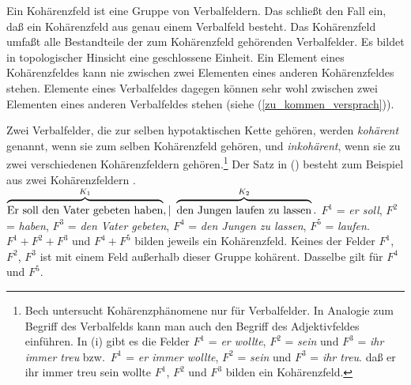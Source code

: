 Ein Kohärenzfeld ist eine Gruppe von Verbalfeldern. Das schließt den Fall ein,
daß ein Kohärenzfeld aus genau einem Verbalfeld besteht. Das Kohärenzfeld umfaßt alle Bestandteile der
zum Kohärenzfeld gehörenden Verbalfelder. Es bildet in topologischer
Hinsicht eine geschlossene Einheit. Ein Element eines Kohärenzfeldes kann nie zwischen
zwei Elementen eines anderen Kohärenzfeldes stehen. Elemente eines Verbalfeldes dagegen
können sehr wohl zwischen zwei Elementen eines anderen Verbalfeldes stehen (siehe (\ref{zu_kommen_versprach})).

Zwei Verbalfelder, die zur selben hypotaktischen Kette gehören, werden \emph{kohärent} genannt,%
wenn sie zum selben Kohärenzfeld gehören, und \emph{inkohärent},%
wenn sie zu zwei verschiedenen Kohärenzfeldern gehören.\footnote{
        Bech untersucht Kohärenzphänomene nur für Verbalfelder.
        In Analogie zum Begriff des Verbalfelds kann man
        auch den Begriff des Adjektivfeldes
        einführen.
        In (i) gibt es die Felder $F^1$ = \emph{er wollte}, $F^2$ = \emph{sein} und
        $F^3$ = \emph{ihr immer treu} bzw.\ $F^1$ = \emph{er immer wollte}, $F^2$ = \emph{sein} und
        $F^3$ = \emph{ihr treu}.
        \ea
        daß er ihr immer treu sein wollte
        \z
        $F^1$, $F^2$ und $F^3$ bilden ein Kohärenzfeld.
}
Der Satz in () besteht zum Beispiel aus zwei Kohärenzfeldern \citep[\S 58]{Bech55a}.
\ea
${\overbrace{\rule{0cm}{2ex}{\textrm{Er~soll~den~Vater~gebeten~haben}}
                 }^{K_1},|~ 
      \overbrace{\rule{0cm}{2ex}{\textrm{den~Jungen~laufen~zu~lassen}}
                }^{K_2}.}$
\z
$F^1$ = \emph{er soll}, $F^2$ = \emph{haben}, $F^3$ = \emph{den Vater gebeten},
$F^4$ = \emph{den Jungen zu lassen}, $F^5$ = \emph{laufen}. $F^1 + F^2 + F^3$ und $F^4 + F^5$
bilden jeweils ein Kohärenzfeld. Keines der Felder $F^1$, $F^2$, $F^3$ ist mit einem Feld
außerhalb dieser Gruppe kohärent. Dasselbe gilt für $F^4$ und $F^5$.

